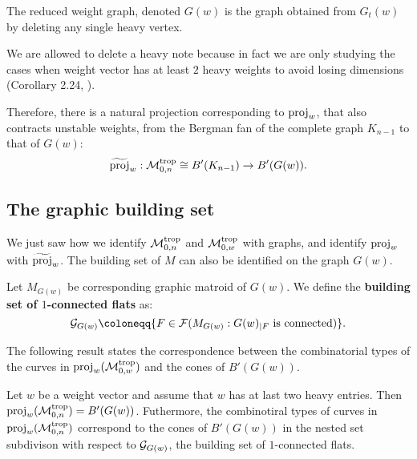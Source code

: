        \begin{definition}
        \label{def:reduced-weight-graph}
            The reduced weight graph, denoted $G(w)$ is the graph obtained from $G_t(w)$ by deleting any single heavy vertex.
        \end{definition}
        
        We are allowed to delete a heavy note because in fact we are only studying the cases when weight vector has at least $2$ heavy weights to avoid losing dimensions 
        (Corollary 2.24, \citet{Cavalieri2014}).
        
        Therefore, there is a natural projection corresponding to $\operatorname{proj}_w$,
        that also contracts unstable weights, from the Bergman fan of the complete graph $K_{n - 1}$ to that of $G(w)$:
        \[
        \widetilde{\operatorname{proj}}_w: \mathcal{M}_{0, n}^{\operatorname{trop}} \cong B'(K_{n - 1}) \rightarrow B'(G(w)).
        \]
        
    \subsection{The graphic building set}
    \label{subsec:graphic-building-set}
        We just saw how we identify $\mathcal{M}_{0, n}^{\operatorname{trop}}$ and $\mathcal{M}_{0, w}^{\operatorname{trop}}$ with graphs,
        and identify $\operatorname{proj}_w$ with $\widetilde{\operatorname{proj}}_w$. 
        The building set of $M$ can also be identified on the graph $G(w)$.
        
        \begin{definition}
        \label{def:building-set-of-1-connected-flats}
            Let $M_{G(w)}$ be corresponding graphic matroid of $G(w)$.
            We define the \textbf{building set of $1$-connected flats} as:
            \[
            \calg_{G(w)} \coloneqq \{F \in \calf(M_{G(w)}: G(w)_{|F} \text{ is connected})\}.
            \]
        \end{definition}
        
        The following result states the correspondence between the combinatorial types of the curves in $\operatorname{proj}_w(\mathcal{M}_{0, w}^{\operatorname{trop}})$ and the cones of $B'(G(w))$.
        \begin{theorem}
        \label{thm:correspondence-fan-cone}
            Let $w$ be a weight vector and assume that $w$ has at last two heavy entries.
            Then $\operatorname{proj}_w(\mathcal{M}_{0, n}^{\operatorname{trop}}) = B'(G(w))$. 
            Futhermore, the combinotiral types of curves in $\operatorname{proj}_w(\mathcal{M}_{0, n}^{\operatorname{trop}})$ correspond to the cones of $B'(G(w))$ in the nested set subdivison with respect to $\mathcal{G}_{G(w)}$, the building set of $1$-connected flats.
        \end{theorem}
        
